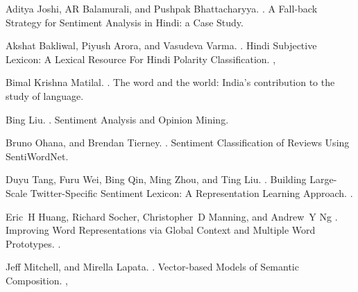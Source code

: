 \def\DevnagVersion{2.15}\documentclass[11pt]{article}
\begin{document}
\begin{thebibliography}{40}


Aditya Joshi, AR Balamurali, and Pushpak Bhattacharyya.
.
\newblock A Fall-back Strategy for Sentiment Analysis in Hindi: a Case Study.

Akshat Bakliwal, Piyush Arora, and Vasudeva Varma.
.
\newblock Hindi Subjective Lexicon: A Lexical Resource For Hindi Polarity Classification.
,

Bimal Krishna Matilal.
.
\newblock The word and the world: India's contribution to the study of language.

Bing Liu.
.
\newblock Sentiment Analysis and Opinion Mining.

Bruno Ohana, and Brendan Tierney.
.
\newblock Sentiment Classification of Reviews Using SentiWordNet.

Duyu Tang, Furu Wei, Bing Qin, Ming Zhou, and Ting Liu.
.
\newblock Building Large-Scale Twitter-Specific Sentiment Lexicon: A Representation Learning Approach.
.

Eric~H Huang, Richard Socher, Christopher~D Manning, and Andrew~Y Ng
.
\newblock Improving Word Representations via Global Context and Multiple Word Prototypes.
.

   
Jeff Mitchell, and Mirella Lapata.
.
\newblock Vector-based Models of Semantic Composition.
,


\end{thebibliography}
\end{document}

